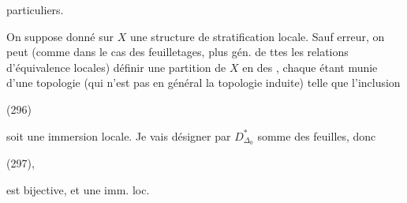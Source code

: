 
particuliers.


On suppose donné sur $X$ une structure de stratification locale. Sauf erreur, on peut (comme dans le cas des feuilletages, plus gén. de ttes les relations d'équivalence locales) définir  une partition de $X$ en des  , chaque   étant munie d'une topologie (qui n'est pas en général la topologie induite) telle que l'inclusion

(296)\quad{}

soit une immersion locale. Je vais désigner par $D_{\Delta_0}^{*}$   somme des feuilles, donc

(297)\quad{},

 est bijective, et une imm. loc.

